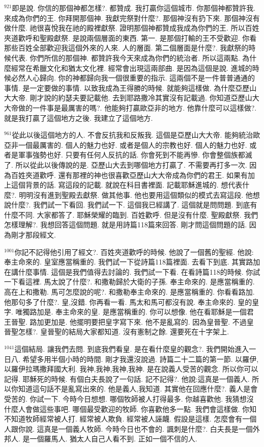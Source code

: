 \documentclass{book}
\begin{document}
$^{921}$即是說.
你信的那個神都怎樣?.
都贊成.
我打贏你這個城市.
你那個神都贊許我.
來成為你們的王.
你拜開那個神.
我獻完祭對什麼?.
那個神沒有扔下來.
那個神沒有做什麼.
祂很喜悅我在祂的殿裡獻祭.
證明那個神都贊成我成為你們的王.
所以百姓夾道歡呼和聖殿獻祭.
是說兩個層面的東西.
第一.
是那個打輸的王不受歡迎.
你看那些百姓全部歡迎我這個外來的人來.
人的層面.
第二個層面是什麼?.
我獻祭的時候代表.
你們所信的那個神.
都贊許我今天來成為你們的統治者.
所以這兩點.
為什麼經常在希臘文化和猶太文化裡.
經常會出現這兩部曲.
是因為這個是說.
進城的時候必然人心歸向.
你的神都歸向我一個很重要的指示.
這兩個不是一件普普通通的事情.
是一定要做的事情.
以致我成為王得勝的時候.
就能夠這樣做.
為什麼亞歷山大大帝.
剛才說的約瑟夫要記載他.
去到耶路撒冷其實沒有記載過.
你知道亞歷山大大帝做的一件事是最厲害的嗎?.
他能夠打贏歐亞非的地方.
他靠什麼可以這樣做?.
就是我打贏了這個地方之後.
我建立了這個地方.

$^{961}$從此以後這個地方的人.
不會反抗我和反叛我.
這個是亞歷山大大帝.
能夠統治歐亞非一個最厲害的.
個人的魅力也好.
或者是個人的宗教也好.
個人的魅力也好.
或者是軍事強勢也好.
只要有任何人反抗的話.
你會死到不能再慘.
你會整個族都滅了.
所以從此以後傳說的是.
亞歷山大去到哪個地方打贏了.
不需要再打多一次.
因為百姓夾道歡呼.
還有那裡的神也很喜歡亞歷山大大帝成為你們的君王.
如果有加上這個背景的話.
寫這段的記載.
就說在科目書裡面.
記載耶穌進城的.
想代表什麼?.
明明沒有進到聖殿去獻祭.
做其他事.
他也要用這個類似的模式去寫這段.
他想說什麼?.
我們試一下看回.
我們試一下.
這個我已經講了.
這個就是問問題.
到底有什麼不同.
大家都答了.
耶穌榮耀的臨到.
百姓歡呼.
但是沒有什麼.
聖殿獻祭.
我們怎樣理解?.
我想回答這個問題.
就是用詩篇118篇來回答.
剛才問這個問題的話.
因為剛才那段經文.

$^{1001}$你記不記得他引用了經文?.
百姓夾道歡呼的時候.
他說了一個舊的聖經.
他說:奉主命來的.
皇室應當稱重的.
我們試一下從詩篇118篇裡面.
去看下到底.
其實路加在講什麼事情.
這個是我們值得去討論的.
我們試一下看.
在看詩篇118的時候.
你試一下看這裡.
馬太說了什麼?.
和撒勒歸於大衛的子孫.
奉主命來的.
是應當稱重的.
高在上和撒勒.
馬可怎麼說的呢?.
和撒勒奉主命來的.
是應當稱重的.
你看看路加.
他那句多了什麼?.
皇,沒錯.
你再看一看.
馬太和馬可都沒有說.
奉主命來的.
皇的皇字.
唯獨路加是.
奉主命來的皇.
是應當稱重的.
你可以想像.
他在看耶穌是一個君王晉聖.
路加更加是.
他擺明要把皇字寫下來.
他不是亂寫的.
因為皇晉聖.
不過皇晉聖怎樣?.
皇晉聖的結局大家都知道.
沒有憲制之餘.
還要死在十字架上.

$^{1041}$這個結局.
讓我們去問.
到底我們看皇.
是在看什麼皇的觀念?.
我們開始進入一日八.
希望多用半個小時的時間.
剛才我還沒說過.
詩篇二十二篇的第一節.
以羅伊,以羅伊拉瑪撒拜國大利.
我神,我神,我神,我神.
是在說義人受苦的觀念.
所以你可以記得.
耶穌死的時候.
有個白夫長說了一句話.
記不記得?.
他說:這真是一個義人.
所以你知道這句話不是亂寫出來的.
他是義人,我知道.
其實他在回應什麼?.
義人是會受苦的.
你試一下.
今時今日想想.
哪個牧師被人打得最多.
你越喜歡他.
我猜想沒什麼人會做這些事吧.
哪個最受歡迎的牧師.
你喜歡他多一點.
我們會這樣做.
你知不知道牧師經常被人打.
經常被人欺負.
經常被人誣衊.
假設是這樣.
怎麼會有一個人跟你說.
這真是一個義人牧師.
今時今日也不會的.
諷刺是什麼?.
白夫長是一個外邦人.
是一個羅馬人.
猶太人自己人看不到.
正如一個不信的人.
\end{document}
